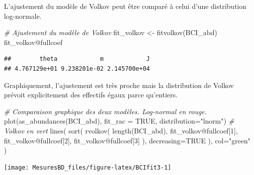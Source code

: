 \documentclass[
  11pt,
  american,
  a4paper,
  extrafontsizes,onecolumn,openright
  ]{memoir}
\newenvironment{Shaded}{\begin{snugshade}}{\end{snugshade}}
\newcommand{\AttributeTok}[1]{\textcolor[rgb]{0.77,0.63,0.00}{#1}}
\newcommand{\CommentTok}[1]{\textcolor[rgb]{0.56,0.35,0.01}{\textit{#1}}}
\newcommand{\ConstantTok}[1]{\textcolor[rgb]{0.00,0.00,0.00}{#1}}
\newcommand{\DecValTok}[1]{\textcolor[rgb]{0.00,0.00,0.81}{#1}}
\newcommand{\FunctionTok}[1]{\textcolor[rgb]{0.00,0.00,0.00}{#1}}
\newcommand{\NormalTok}[1]{#1}
\newcommand{\OtherTok}[1]{\textcolor[rgb]{0.56,0.35,0.01}{#1}}
\newcommand{\SpecialCharTok}[1]{\textcolor[rgb]{0.00,0.00,0.00}{#1}}
\newcommand{\StringTok}[1]{\textcolor[rgb]{0.31,0.60,0.02}{#1}}
\begin{document}
\normalsize

L'ajustement du modèle de Volkov peut être comparé à celui d'une distribution log-normale.

\scriptsize

\begin{Shaded}
\begin{Highlighting}[]
\CommentTok{\# Ajustement du modèle de Volkov}
\NormalTok{fit\_volkov }\OtherTok{\textless{}{-}} \FunctionTok{fitvolkov}\NormalTok{(BCI\_abd)}
\NormalTok{fit\_volkov}\SpecialCharTok{@}\NormalTok{fullcoef}
\end{Highlighting}
\end{Shaded}

\begin{verbatim}
##        theta            m            J 
## 4.767129e+01 9.238201e-02 2.145700e+04
\end{verbatim}

\normalsize

Graphiquement, l'ajustement est très proche mais la distribution de Volkov prévoit explicitement des effectifs égaux parce qu'entiers.

\scriptsize

\begin{Shaded}
\begin{Highlighting}[]
\CommentTok{\# Comparaison graphique des deux modèles. Log{-}normal en rouge.}
\FunctionTok{plot}\NormalTok{(}\FunctionTok{as\_abundances}\NormalTok{(BCI\_abd), }\AttributeTok{fit\_rac =} \ConstantTok{TRUE}\NormalTok{, }\AttributeTok{distribution=}\StringTok{"lnorm"}\NormalTok{)}
\CommentTok{\# Volkov en vert}
\FunctionTok{lines}\NormalTok{(}
  \FunctionTok{sort}\NormalTok{(}
    \FunctionTok{rvolkov}\NormalTok{(}
      \FunctionTok{length}\NormalTok{(BCI\_abd), }
\NormalTok{      fit\_volkov}\SpecialCharTok{@}\NormalTok{fullcoef[}\DecValTok{1}\NormalTok{], }
\NormalTok{      fit\_volkov}\SpecialCharTok{@}\NormalTok{fullcoef[}\DecValTok{2}\NormalTok{], }
\NormalTok{      fit\_volkov}\SpecialCharTok{@}\NormalTok{fullcoef[}\DecValTok{3}\NormalTok{]}
\NormalTok{    ), }
    \AttributeTok{decreasing=}\ConstantTok{TRUE}
\NormalTok{  ), }
  \AttributeTok{col=}\StringTok{"green"}
\NormalTok{)}
\end{Highlighting}
\end{Shaded}

\begin{center}\texttt{[image: MesuresBD\_files/figure-latex/BCIfit3-1]} \end{center}
\end{document}
